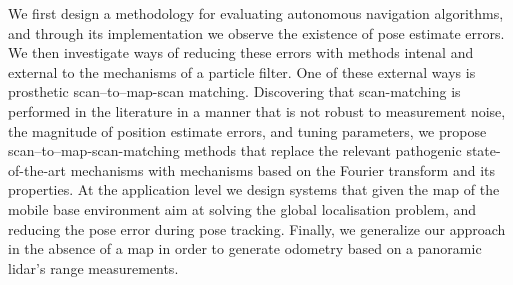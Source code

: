 We first design a methodology for evaluating autonomous navigation algorithms,
and through its implementation we observe the existence of pose estimate
errors. We then investigate ways of reducing these errors with methods intenal
and external to the mechanisms of a particle filter. One of these external ways
is prosthetic scan--to--map-scan matching. Discovering that scan-matching is
performed in the literature in a manner that is not robust to measurement
noise, the magnitude of position estimate errors, and tuning parameters, we
propose scan--to--map-scan-matching methods that replace the relevant
pathogenic state-of-the-art mechanisms with mechanisms based on the Fourier
transform and its properties. At the application level we design systems that
given the map of the mobile base environment aim at solving the global
localisation problem, and reducing the pose error during pose tracking.
Finally, we generalize our approach in the absence of a map in order to
generate odometry based on a panoramic lidar's range measurements.


\restoregeometry
\doublespace

